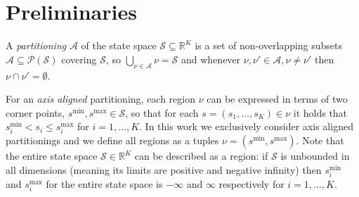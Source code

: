 \section {Preliminaries}%
\label {sec:preliminaries}




\begin {definition}%
\label {def:partitioning}
  A \emph {partitioning} $\mathcal{A}$ of the state space $\mathcal{S} \subseteq
  \mathbb{R}^K$ is a set of non-overlapping subsets $\mathcal{A} \subseteq
  \mathcal{P}(\mathcal{S})$ covering $\mathcal{S}$, so \( \bigcup _{\nu \in
  \mathcal{A}}
  \nu = \mathcal{S} \) and whenever \( \nu, \nu' \in \mathcal{A}, \nu \neq \nu'  \)
  then \( \nu \cap \nu' = \emptyset \).
\end {definition}


For an \textit{axis aligned} partitioning, each region $\nu$ can be expressed in
terms of two corner points, $s^{\min}, s^{\max} \in \mathcal{S}$, so that for
each $s = (s_1, \ldots, s_K) \in \nu$ it holds that $s^{\min}_i < s_i \le
s^{\max}_i$ for $i = 1,\ldots,K$. In this work we exclusively consider axis
aligned partitionings and we define all regions as a tuples $\nu = (s^{\min},
s^{\max})$. Note that the entire state space $\mathcal{S} \in \mathbb{R}^K$ can
be described as a region: if $\mathcal{S}$ is unbounded in all dimensions
(meaning its limits are positive and negative infinity) then $s^{\min}_i$ and
$s^{\max}_i$ for the entire state space is $-\infty$ and $\infty$ respectively
for $i = 1,\ldots,K$.


